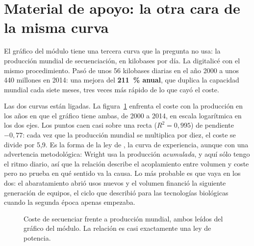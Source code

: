 \documentclass[11pt,letterpaper]{article}
\begin{document}
\section{Material de apoyo: la otra cara de la misma curva}
\label{sec:produccion}

El gráfico del módulo tiene una tercera curva que la pregunta no usa: la
producción mundial de secuenciación, en kilobases por día. La digitalicé con
el mismo procedimiento. Pasó de unos 56 kilobases diarias en el año 2000 a
unos 440 millones en 2014: una mejora del \textbf{211~\% anual}, que duplica la
capacidad mundial cada siete meses, tres veces más rápido de lo que cayó el
coste.

Las dos curvas están ligadas. La figura~\ref{fig:wright} enfrenta el coste con
la producción en los años en que el gráfico tiene ambas, de 2000 a 2014, en
escala logarítmica en los dos ejes. Los puntos caen casi sobre una recta
($R^2 = 0{,}995$) de pendiente $-0{,}77$: cada vez que la producción mundial
se multiplica por diez, el coste se divide por 5,9. Es la forma de la ley de
\textcite{wright1936}, la curva de experiencia, aunque con una advertencia
metodológica: Wright usa la producción \emph{acumulada}, y aquí sólo tengo el
ritmo diario, así que la relación describe el acoplamiento entre volumen y
coste pero no prueba en qué sentido va la causa. Lo más probable es que vaya
en los dos: el abaratamiento abrió usos nuevos y el volumen financió la
siguiente generación de equipos, el ciclo que \textcite{carlson2003} describió
para las tecnologías biológicas cuando la segunda época apenas empezaba.

\begin{figure}[htbp]
\centering
{}
\caption{Coste de secuenciar frente a producción mundial, ambos leídos del
gráfico del módulo. La relación es casi exactamente una ley de potencia.}
\label{fig:wright}
\end{figure}
\end{document}
